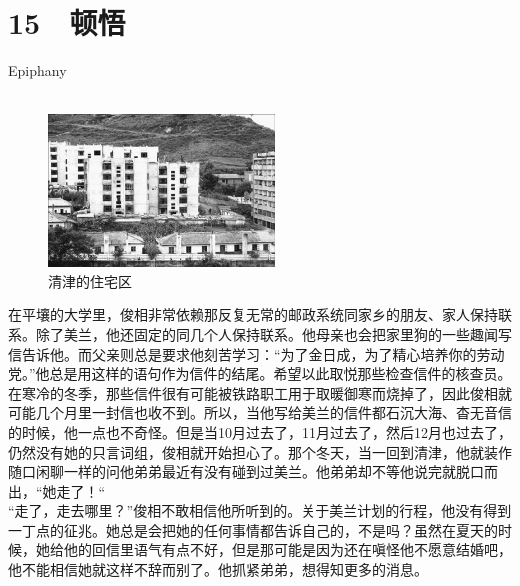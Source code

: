 \fancyhead[RO]{{\tiny{\textcolor{Gray}{\FA \ }}}\thepage}
\fancyhead[LE]{{\tiny{\textcolor{Gray}{\FA \ }}}\thepage}
\fancyfoot[LE,RO]{}
\fancyfoot[LO,CE]{}
\fancyfoot[CO,RE]{}
\chapter*{15 {\FA } 顿悟}
\vspace{15mm}
\begin{flushright}
	\textcolor{PinYinColor}{\EN \huge{Epiphany\\
	\ \\}}
\end{flushright}
\begin{figure}[!htbp]
\centering
\includegraphics[width=6cm]{./Chapters/Images/15.jpg}
\caption*{清津的住宅区}
\end{figure}

在平壤的大学里，俊相非常依赖那反复无常的邮政系统同家乡的朋友、家人保持联系。除了美兰，他还固定的同几个人保持联系。他母亲也会把家里狗的一些趣闻写信告诉他。而父亲则总是要求他刻苦学习：“为了金日成，为了精心培养你的劳动党。”他总是用这样的语句作为信件的结尾。希望以此取悦那些检查信件的核查员。在寒冷的冬季，那些信件很有可能被铁路职工用于取暖御寒而烧掉了，因此俊相就可能几个月里一封信也收不到。所以，当他写给美兰的信件都石沉大海、杳无音信的时候，他一点也不奇怪。但是当10月过去了，11月过去了，然后12月也过去了，仍然没有她的只言词组，俊相就开始担心了。那个冬天，当一回到清津，他就装作随口闲聊一样的问他弟弟最近有没有碰到过美兰。他弟弟却不等他说完就脱口而出，“她走了！“\\

“走了，走去哪里？”俊相不敢相信他所听到的。关于美兰计划的行程，他没有得到一丁点的征兆。她总是会把她的任何事情都告诉自己的，不是吗？虽然在夏天的时候，她给他的回信里语气有点不好，但是那可能是因为还在嗔怪他不愿意结婚吧，他不能相信她就这样不辞而别了。他抓紧弟弟，想得知更多的消息。\\


